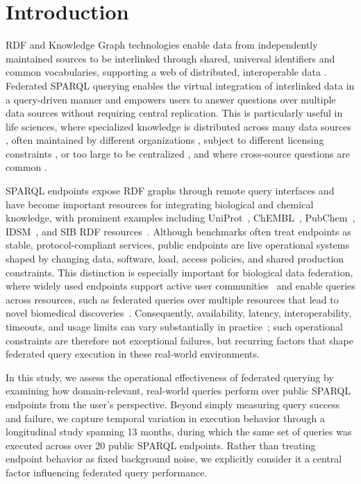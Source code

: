 \documentclass[runningheads]{llncs}
\begin{document}
\section{Introduction}\label{sec1}
RDF and Knowledge Graph technologies enable data from independently maintained sources to be interlinked through shared, universal identifiers and common vocabularies, supporting a web of distributed, interoperable data \cite{hogan2021knowledge}.
Federated SPARQL querying enables the virtual integration of interlinked data in a query-driven manner and empowers users to answer questions over multiple data sources without requiring central replication. 
This is particularly useful in life sciences, where specialized knowledge is distributed across many data sources \cite{hasnain2017biofed}, often maintained by different organizations \cite{khan2017safe}, subject to different licensing constraints \cite{Moreau2021}, or too large to be centralized \cite{lubiana2025split}, and where cross-source questions are common \cite{Morgat2020Rhea}. 

SPARQL endpoints expose RDF graphs through remote query interfaces and have become important resources for integrating biological and chemical knowledge, with prominent examples including UniProt~\cite{uniprot2025}, ChEMBL~\cite{Willighagen2013ChEMBL}, PubChem~\cite{Fu2015PubChemRDF}, IDSM~\cite{Galgonek2021ChemWebRDF}, and SIB RDF resources~\cite{sib2024semanticweb}. 
Although benchmarks often treat endpoints as stable, protocol-compliant services, public endpoints are live operational systems shaped by changing data, software, load, access policies, and shared production constraints. 
This distinction is especially important for biological data federation, where widely used endpoints support active user communities~\cite{uniprot2025} and enable queries across resources, such as federated queries over multiple resources that lead to novel biomedical discoveries~\cite{Morgat2020Rhea}. 
Consequently, availability, latency, interoperability, timeouts, and usage limits can vary substantially in practice~\cite{Vandenbussche2017SPARQLES}; such operational constraints are therefore not exceptional failures, but recurring factors that shape federated query execution in these real-world environments.

In this study, we assess the operational effectiveness of federated querying by examining how domain-relevant, real-world queries perform over public SPARQL endpoints from the user’s perspective. 
Beyond simply measuring query success and failure, we capture temporal variation in execution behavior through a longitudinal study spanning 13 months, during which the same set of queries was executed across over 20 public SPARQL endpoints. 
Rather than treating endpoint behavior as fixed background noise, we explicitly consider it a central factor influencing federated query performance.
\end{document}
